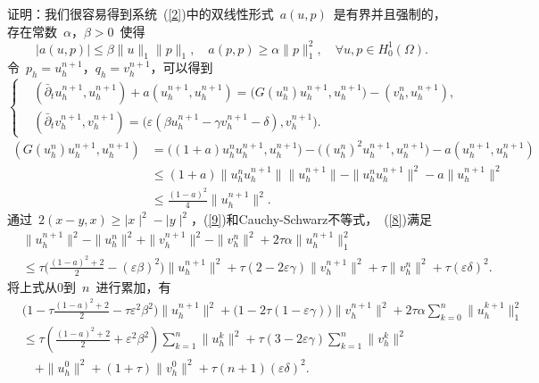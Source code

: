\documentclass[twoside,UTF8]{nputhesis}
\begin{document}
证明：我们很容易得到系统~(\ref{2})中的双线性形式~$a(u,p)$~是有界并且强制的，存在常数~$\alpha$，$\beta>0$~使得
\begin{equation*}
\mid a(u,p)\mid\leq\beta\| u\|_1\| p\|_1, \quad a(p,p)\geq \alpha\| p\|^2_1,\quad\forall u,p\in H_0^1(\Omega).
\label{7}
\end{equation*}
令~$p_h=u^{n+1}_h$，$q_h=v^{n+1}_h$，可以得到
\begin{equation}
\left\{\begin{aligned}&(\bar{\partial}_tu^{n+1}_h,u^{n+1}_h)+a(u^{n+1}_h,u^{n+1}_h)=\big(G(u^n_h)u_h^{n+1},u^{n+1}_h\big)-(v_h^n,u^{n+1}_h), \\&(\bar{\partial}_tv^{n+1}_h,v^{n+1}_h)=\big(\varepsilon(\beta u^{n+1}_h-\gamma v^{n+1}_h-\delta),v^{n+1}_h\big).\end{aligned}\right.
\label{8}
\end{equation}
\begin{equation}
\begin{split}
(G(u^n_h)u_h^{n+1},u^{n+1}_h)&=\big((1+a)u^n_hu^{n+1}_h,u^{n+1}_h\big)-\big((u^n_h)^2u^{n+1}_h,u^{n+1}_h\big)-a(u^{n+1}_h,u^{n+1}_h)\\
&\leq(1+a)\| u^n_hu^{n+1}_h\|\| u^{n+1}_h\|-\| u^n_hu^{n+1}_h\|^2-a\| u^{n+1}_h\|^2\\
&\leq\frac{(1-a)^2}{4}\| u^{n+1}_h\|^2.
\end{split}
\label{9}
\end{equation}
通过~$2(x-y,x)\geq\mid x\mid^2-\mid y\mid^2$，(\ref{9})和Cauchy-Schwarz不等式，~(\ref{8})满足
\begin{equation*}
\begin{split}
&\| u^{n+1}_h\|^2-\| u^{n}_h\|^2+\| v^{n+1}_h\|^2-\| v^n_h\|^2+2\tau\alpha\| u^{n+1}_h\|^2_1 \\
&\leq\tau\Big(\frac{(1-a)^2+2}{2}-(\varepsilon\beta)^2\Big)\|u^{n+1}_h\|^2+\tau(2-2\varepsilon\gamma)\|v^{n+1}_h\|^2+\tau\|v^{n}_h\|^2+\tau (\varepsilon\delta)^2.
\end{split}
\label{10}
\end{equation*}
将上式从0到~$n$~进行累加，有
\begin{equation*}
\begin{split}
&\Big(1-\tau\frac{(1-a)^2+2}{2}-\tau\varepsilon^2\beta^2\Big)\| u^{n+1}_h\|^2+\big(1-2\tau(1-\varepsilon\gamma)\big)\| v^{n+1}_h\|^2+2\tau\alpha\sum^{n}_{k=0}\parallel u^{k+1}_h\parallel^2_1\\
&\leq\tau\left(\frac{(1-a)^2+2}{2}+\varepsilon^2\beta^2\right)\sum^n_{k=1}\parallel u^k_h\parallel^2+\tau(3-2\varepsilon\gamma)\sum^n_{k=1}\parallel v^k_h\parallel^2\\
&\quad+\parallel u^0_h\parallel^2+(1+\tau)\parallel v^0_h\parallel^2+\tau(n+1)(\varepsilon\delta)^2.
\end{split}
\label{12}
\end{equation*}
\end{document}
